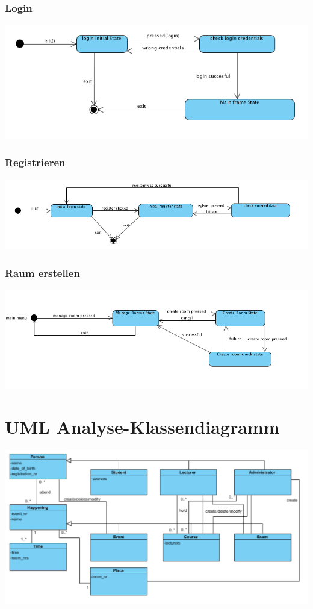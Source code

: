 \documentclass[a4paper,12pt]{article}
\begin{document}
		\subsubsection*{Login}
			\begin{center}
				\includegraphics[scale=.5]{sc_login.png}
			\end{center}
		\subsubsection*{Registrieren}
			\begin{center}
				\includegraphics[scale=.5]{sc_register.png}
			\end{center}
		\subsubsection*{Raum erstellen}
			\begin{center}
				\includegraphics[scale=.5]{sc_manage_room.png}
			\end{center}
\section*{UML Analyse-Klassendiagramm}
\begin{center}
	\includegraphics[scale=.7]{AnalysisClassDiagram.png}
\end{center}
\end{document}
